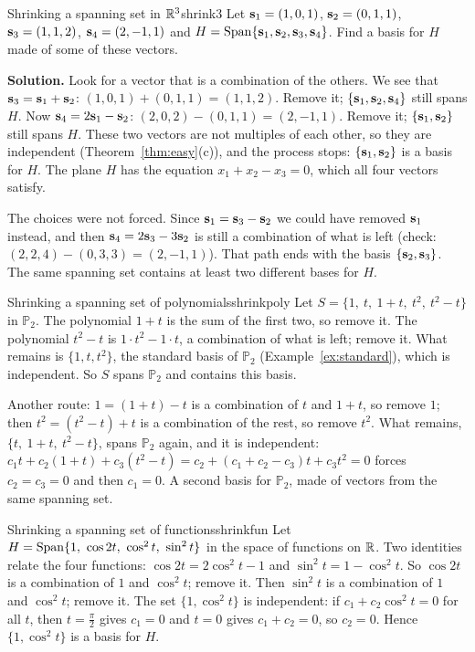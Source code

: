 \documentclass[11pt]{article}
\begin{document}
\begin{exmp}{Shrinking a spanning set in $\mathbb{R}^3$}{shrink3}
Let $\mathbf{s}_1=(1,0,1)$, $\mathbf{s}_2=(0,1,1)$, $\mathbf{s}_3=(1,1,2)$, $\mathbf{s}_4=(2,-1,1)$ and $H=\operatorname{Span}\{\mathbf{s}_1,\mathbf{s}_2,\mathbf{s}_3,\mathbf{s}_4\}$. Find a basis for $H$ made of some of these vectors.

\textbf{Solution.} Look for a vector that is a combination of the others. We see that $\mathbf{s}_3=\mathbf{s}_1+\mathbf{s}_2$: $(1,0,1)+(0,1,1)=(1,1,2)$. Remove it; $\{\mathbf{s}_1,\mathbf{s}_2,\mathbf{s}_4\}$ still spans $H$. Now $\mathbf{s}_4=2\mathbf{s}_1-\mathbf{s}_2$: $(2,0,2)-(0,1,1)=(2,-1,1)$. Remove it; $\{\mathbf{s}_1,\mathbf{s}_2\}$ still spans $H$. These two vectors are not multiples of each other, so they are independent (Theorem~\ref{thm:easy}(c)), and the process stops: $\{\mathbf{s}_1,\mathbf{s}_2\}$ is a basis for $H$. The plane $H$ has the equation $x_1+x_2-x_3=0$, which all four vectors satisfy.

The choices were not forced. Since $\mathbf{s}_1=\mathbf{s}_3-\mathbf{s}_2$ we could have removed $\mathbf{s}_1$ instead, and then $\mathbf{s}_4=2\mathbf{s}_3-3\mathbf{s}_2$ is still a combination of what is left (check: $(2,2,4)-(0,3,3)=(2,-1,1)$). That path ends with the basis $\{\mathbf{s}_2,\mathbf{s}_3\}$. The same spanning set contains at least two different bases for $H$.
\end{exmp}

\begin{exmp}{Shrinking a spanning set of polynomials}{shrinkpoly}
Let $S=\{1,\ t,\ 1+t,\ t^2,\ t^2-t\}$ in $\mathbb{P}_2$. The polynomial $1+t$ is the sum of the first two, so remove it. The polynomial $t^2-t$ is $1\cdot t^2-1\cdot t$, a combination of what is left; remove it. What remains is $\{1,t,t^2\}$, the standard basis of $\mathbb{P}_2$ (Example~\ref{ex:standard}), which is independent. So $S$ spans $\mathbb{P}_2$ and contains this basis.

Another route: $1=(1+t)-t$ is a combination of $t$ and $1+t$, so remove $1$; then $t^2=(t^2-t)+t$ is a combination of the rest, so remove $t^2$. What remains, $\{t,\ 1+t,\ t^2-t\}$, spans $\mathbb{P}_2$ again, and it is independent: $c_1t+c_2(1+t)+c_3(t^2-t)=c_2+(c_1+c_2-c_3)t+c_3t^2=0$ forces $c_2=c_3=0$ and then $c_1=0$. A second basis for $\mathbb{P}_2$, made of vectors from the same spanning set.
\end{exmp}

\begin{exmp}{Shrinking a spanning set of functions}{shrinkfun}
Let $H=\operatorname{Span}\{1,\ \cos2t,\ \cos^2t,\ \sin^2t\}$ in the space of functions on $\mathbb{R}$. Two identities relate the four functions: $\cos2t=2\cos^2t-1$ and $\sin^2t=1-\cos^2t$. So $\cos2t$ is a combination of $1$ and $\cos^2t$; remove it. Then $\sin^2t$ is a combination of $1$ and $\cos^2t$; remove it. The set $\{1,\cos^2t\}$ is independent: if $c_1+c_2\cos^2t=0$ for all $t$, then $t=\tfrac{\pi}{2}$ gives $c_1=0$ and $t=0$ gives $c_1+c_2=0$, so $c_2=0$. Hence $\{1,\cos^2t\}$ is a basis for $H$.
\end{exmp}
\end{document}
